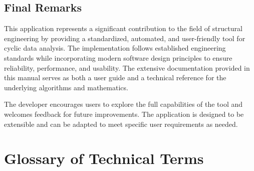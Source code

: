 \documentclass[11pt,a4paper]{article}
\begin{document}
\subsection{Final Remarks}

This application represents a significant contribution to the field of structural engineering by providing a standardized, automated, and user-friendly tool for cyclic data analysis. The implementation follows established engineering standards while incorporating modern software design principles to ensure reliability, performance, and usability. The extensive documentation provided in this manual serves as both a user guide and a technical reference for the underlying algorithms and mathematics.

The developer encourages users to explore the full capabilities of the tool and welcomes feedback for future improvements. The application is designed to be extensible and can be adapted to meet specific user requirements as needed.

\appendix
\section{Glossary of Technical Terms}
\end{document}
